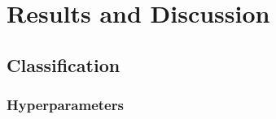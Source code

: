 \documentclass[twoside,11pt]{report}
\begin{document}


\newpage

\section{Results and Discussion}
\label{sec:resultsdiscussion}


\subsection{Classification}
\label{sec:classification}


\subsubsection{Hyperparameters}
\label{sec:hyperparameters}
\end{document}
